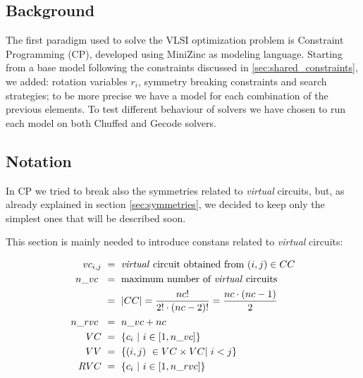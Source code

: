 
\subsection{Background}
    The first paradigm used to solve the VLSI optimization problem is Constraint Programming (CP),
    developed using MiniZinc as modeling language. 
    Starting from a base model following the constraints discussed in \ref{sec:shared_constraints},
    we added: rotation variables $r_i$, symmetry breaking constraints and search strategies;
    to be more precise we have a model for each combination of the previous elements.
    To test different behaviour of solvers we have chosen to run each model on both Chuffed and Gecode solvers.


\subsection{Notation} \label{sec:CP_notation}
    In CP we tried to break also the symmetries related to \textit{virtual} circuits, but, as already
    explained in section \ref{sec:symmetries}, we decided to keep only the simplest ones that will 
    be described soon.

    This section is mainly needed to introduce constans related to \textit{virtual} circuits:
    
    \begin{align*}
        vc_{i,j}    &\ =\ \text{\textit{virtual} circuit obtained from  } (i,j) \in CC      \\
        n\_vc\      &\ =\ \text{maximum number of \textit{virtual} circuits}                \\
                    &\ =\ |CC| = \frac{nc!}{2! \cdot (nc - 2)!} = \frac{nc \cdot (nc-1)}{2} \\
        n\_rvc\     &\ =\ n\_vc + nc                                                        \\
        VC          &\ =\ \{ c_i\ |\ i \in [1,n\_vc] \}                                     \\
        VV          &\ =\ \{ (i,j)\ \in VC \times VC |\ i <j \}                             \\
        RVC         &\ =\ \{ c_i\ |\ i \in [1,n\_rvc] \}                                    \\
    \end{align*}

